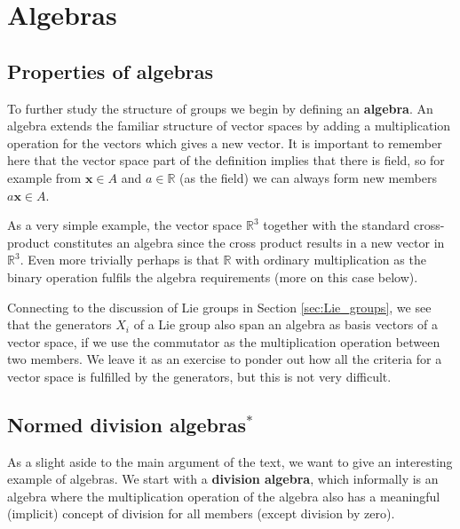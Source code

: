 \documentclass[notes.tex]{subfiles}
\begin{document}
\chapter{Algebras}
\label{chap:algebras}

\section{Properties of algebras}
\label{sec:algebras}

To further study the structure of groups we begin by defining an {\bf algebra}. An algebra extends the familiar structure of vector spaces by adding a multiplication operation for the vectors which gives a new vector.
It is important to remember here that the vector space part of the definition implies that there is field, so for example from $\mathbf x\in A$ and $a\in \mathbb{R}$ (as the field) we can always form new members $a\mathbf x\in A$.

As a very simple example, the vector space $\mathbb{R}^3$ together with the standard cross-product constitutes an algebra since the cross product results in a new vector in  $\mathbb{R}^3$. Even more trivially perhaps is that $\mathbb{R}$ with ordinary multiplication as the binary operation fulfils the algebra requirements (more on this case below).

Connecting to the discussion of Lie groups in Section \ref{sec:Lie_groups}, we see that the generators $X_i$ of a Lie group also span an algebra as basis vectors of a vector space, if we use the commutator as  the multiplication operation between two members. We leave it as an exercise to ponder out how all the criteria for a vector space is fulfilled by the generators, but this is not very difficult.


\section{Normed division algebras$^*$}
\label{sec:normed_division_algebras}
As a slight aside to the main argument of the text, we want to give an interesting example of algebras. We start with a {\bf division algebra}, which informally is an algebra where the multiplication operation of the algebra also has a meaningful (implicit) concept of division for all members (except division by zero).
\end{document}
